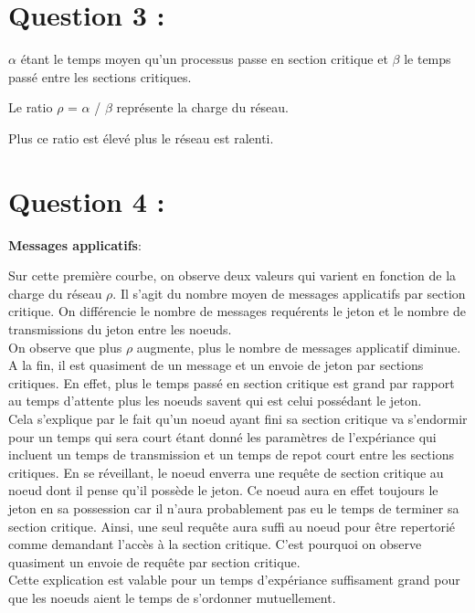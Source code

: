 \documentclass[11pt,a4paper]{report}
\begin{document}
\section{Question 3 :}

$\alpha$ étant le temps moyen qu'un processus passe en section critique et $\beta$ le temps passé entre les sections critiques.

Le ratio $\rho$ = $\alpha$ / $\beta$ représente la charge du réseau.

Plus ce ratio est élevé plus le réseau est ralenti.

\section{Question 4 :}

\textbf{Messages applicatifs}:

Sur cette première courbe, on observe deux valeurs qui varient en fonction de la charge du réseau $\rho$. Il s'agit du nombre moyen de messages applicatifs par section critique. On différencie le nombre de messages requérents le jeton et le nombre de transmissions du jeton entre les noeuds.\\

On observe que plus $\rho$ augmente, plus le nombre de messages applicatif diminue. A la fin, il est quasiment de un message et un envoie de jeton par sections critiques. En effet, plus le temps passé en section critique est grand par rapport au temps d'attente plus les noeuds savent qui est celui possédant le jeton.\\

Cela s'explique par le fait qu'un noeud ayant fini sa section critique va s'endormir pour un temps qui sera court étant donné les paramètres de l'expériance qui incluent un temps de transmission et un temps de repot court entre les sections critiques. En se réveillant, le noeud enverra une requête de section critique au noeud dont il pense qu'il possède le jeton. Ce noeud aura en effet toujours le jeton en sa possession car il n'aura probablement pas eu le temps de terminer sa section critique. Ainsi, une seul requête aura suffi au noeud pour être repertorié comme demandant l'accès à la section critique. C'est pourquoi on observe quasiment un envoie de requête par section critique.\\

Cette explication est valable pour un temps d'expériance suffisament grand pour que les noeuds aient le temps de s'ordonner mutuellement.\\
\end{document}
